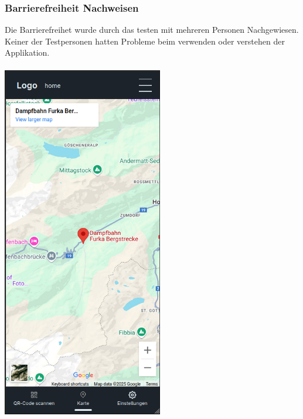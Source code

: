 \documentclass[10pt]{article}
\begin{document}
	\subsubsection{Barrierefreiheit Nachweisen}
	Die Barrierefreihet wurde durch das testen mit mehreren Personen Nachgewiesen. Keiner der Testpersonen hatten Probleme beim verwenden oder verstehen der Applikation.\\\\
	\includegraphics[width=7cm ]{mainpage}
	
\end{document}
